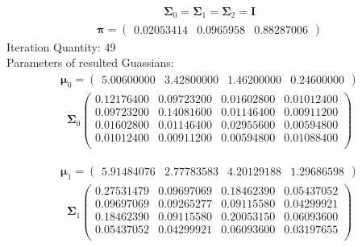 \documentclass[11pt,a4paper]{article}
\newcommand{\htab}{\hspace*{0.63cm}}
\newcommand{\bs}[1]{\boldsymbol{#1}}
\begin{document}
\begin{align} 
    \bs{\Sigma}_{0} = \bs{\Sigma}_{1} = \bs{\Sigma}_{2} = \bs{I}
\end{align} \vspace{-1cm}
\begin{align}  \bs{\pi} = \begin{pmatrix}
    0.02053414 & 0.0965958 &  0.88287006
\end{pmatrix} \end{align}
\htab Iteration Quantity: 49 \\
\htab Parameters of resulted Guassians:
\begin{align} \bs{\mu}_{0} = \begin{pmatrix} 
5.00600000 & 3.42800000 & 1.46200000 & 0.24600000 
 \end{pmatrix}  \end{align} \vspace{-1cm} 
\begin{align} \bs{\Sigma}_{0}\begin{pmatrix} 
0.12176400 & 0.09723200 & 0.01602800 & 0.01012400 \\ 
0.09723200 & 0.14081600 & 0.01146400 & 0.00911200 \\ 
0.01602800 & 0.01146400 & 0.02955600 & 0.00594800 \\ 
0.01012400 & 0.00911200 & 0.00594800 & 0.01088400 \\ 
\end{pmatrix} \end{align}

\begin{align} \bs{\mu}_{1} = \begin{pmatrix} 
5.91484076 & 2.77783583 & 4.20129188 & 1.29686598 
 \end{pmatrix}  \end{align} \vspace{-1cm} 
\begin{align} \bs{\Sigma}_{1}\begin{pmatrix} 
0.27531479 & 0.09697069 & 0.18462390 & 0.05437052 \\ 
0.09697069 & 0.09265277 & 0.09115580 & 0.04299921 \\ 
0.18462390 & 0.09115580 & 0.20053150 & 0.06093600 \\ 
0.05437052 & 0.04299921 & 0.06093600 & 0.03197655 \\ 
\end{pmatrix} \end{align}
\end{document}
